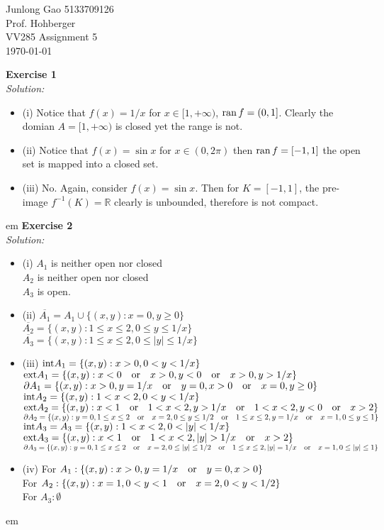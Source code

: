 \documentclass[12pt]{article}
\def\es#1#2{{\bf Exercise #1}\\{\it Solution:}\begin{itemize}
 \setlength{\itemsep}{2pt}
 \setlength{\parskip}{0pt}
 \setlength{\parsep}{0pt}
 #2
 \end{itemize}\vskip 1 em}
\def\ran#1{{\rm ran}\,#1}
\begin{document}
 
\begin{flushleft}
  Junlong Gao 5133709126\\ 
  Prof.  Hohberger\\ 
  VV285 Assignment 5\\
  \today 
\end{flushleft}
\es{1}{
 \item[(i)]
	Notice that $f(x)=1/x$ for $x\in[1,+\infty)$,  $\ran f=(0,1]$. 
	Clearly the domian $A=[1,+\infty)$ is closed yet the range is not.
 \item[(ii)]
	Notice that $f(x)=\sin x$ for $x\in(0,2\pi)$ 
	then $\ran f=[-1,1]$ the open set is mapped into a closed set.
 \item[(iii)]	
	No. Again, consider $f(x)=\sin x$. Then for $K=[-1,1]$, 
	the pre-image $f^{-1}(K)=\mathbb{R}$ clearly is unbounded, 
	therefore is not compact.
}
\es{2}{
 \item[(i)]
 	$A_1$ is neither open nor closed\\
	$A_2$ is  neither open nor closed\\
	$A_3$ is open.
 \item[(ii)]
 	$\overline{A_1}=A_1\cup\{(x,y):x=0,y\ge0\}$\\
	$\overline{A_2}=\{(x,y):1\leq x\leq 2, 0\leq y\leq 1/x\}$\\
	$\overline{A_3}=\{(x,y):1\leq x\leq 2, 0\leq |y|\leq 1/x\}$
 \item[(iii)]	
 	${\rm int} A_1=\{(x,y): x>0, 0< y< 1/x\}$\\
	${\rm ext} A_1=\{(x,y): x<0
	\quad{\rm or }\quad x>0, y<0 
	\quad{\rm or }\quad x>0,y>1/x\}$\\
	$\partial A_1=\{(x,y): x>0, y=1/x
	\quad {\rm or}\quad y=0, x>0
	\quad {\rm or}\quad x=0, y\ge0\}$\\
	${\rm int} A_2=\{(x,y):1< x< 2, 0< y<1/x\}$\\
	${\rm ext} A_2=\{(x,y):x< 1
	\quad {\rm or}\quad 1<x<2, y>1/x
	\quad {\rm or}\quad 1<x<2, y<0
	\quad{\rm or}\quad x>2\}$
	$\partial A_2=\{(x,y): y=0,1\leq x\leq 2
	\quad{\rm or}\quad x=2, 0\leq y\leq 1/2
	\quad{\rm or}\quad 1\leq x\leq 2, y=1/x
	\quad {\rm or}\quad x=1,0\leq y\leq 1 \}$\\
	${\rm int} A_3=A_3=\{(x,y):1< x< 2, 0< |y|< 1/x\}$\\
	${\rm ext} A_3=\{(x,y):x< 1
	\quad {\rm or}\quad 1<x<2, |y|>1/x
	\quad{\rm or}\quad x>2\}$\\
	$\partial A_3=\{(x,y): y=0,1\leq x\leq 2
	\quad{\rm or}\quad x=2, 0\leq |y|\leq 1/2
	\quad{\rm or}\quad 1\leq x\leq 2, |y|=1/x
	\quad {\rm or}\quad x=1,0\leq |y|\leq 1 \}$
\item[(iv)]	
	For $A_1:\{(x,y): x>0, y=1/x
	\quad {\rm or}\quad y=0, x>0\}$\\
	For $A_2:\{(x,y):x=1, 0<y<1\quad{\rm or}\quad x=2, 0<y<1/2\}$\\
	For $A_3: \emptyset$
}
\end{document}
